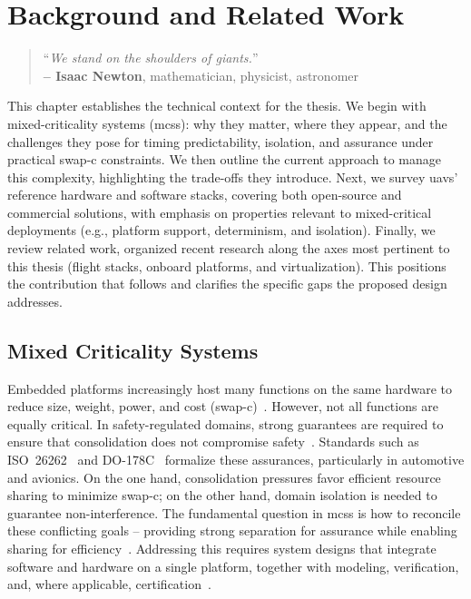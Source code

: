 %
\chapter{Background and Related Work}%
\label{ch:state-art}
%
\begin{quote}
\begin{flushright}
``\emph{We stand on the shoulders of giants.}'' \\
\textbf{-- Isaac Newton}, mathematician, physicist, astronomer
\end{flushright}
\end{quote}

This chapter establishes the technical context for the thesis. We begin with mixed-criticality systems (\glspl{mcs}): why they matter, where they appear, and the challenges they pose for timing predictability, isolation, and assurance under practical \gls{swap-c} constraints. We then outline the current approach to manage this complexity, highlighting the trade-offs they introduce.
%
Next, we survey \glspl{uav}' reference hardware and software
stacks, covering both open-source and commercial solutions, with emphasis on
properties relevant to mixed-critical deployments (e.g., platform support,
determinism, and isolation).
%
Finally, we review related work, organized recent research along the axes most
pertinent to this thesis (flight stacks, onboard platforms, and
virtualization). This positions the contribution that follows and clarifies the
specific gaps the proposed design addresses.

\section{Mixed Criticality Systems}%
\label{sec:mixed-crit-syst}
Embedded platforms increasingly host many functions on the same hardware to
reduce size, weight, power, and cost (\gls{swap-c})~\cite{burns2022mixed}.
However, not all functions are equally critical. In safety-regulated domains,
strong guarantees are required to ensure that consolidation does not compromise
safety~\cite{burns2022mixed,davis_mixed_2018}.
%
Standards such as ISO~26262~\cite{iso26262} and DO-178C~\cite{sc_167_software_1992}
formalize these assurances, particularly in automotive and avionics.
On the one hand, consolidation pressures favor efficient resource sharing to
minimize \gls{swap-c}; on the other hand, domain isolation is needed to
guarantee non-interference. The fundamental question in \glspl{mcs} is how to
reconcile these conflicting goals -- providing strong separation for assurance
while enabling sharing for efficiency~\cite{burns2022mixed}. Addressing this
requires system designs that integrate software and hardware on a single
platform, together with modeling, verification, and, where applicable,
certification~\cite{davis_mixed_2018,youn_software_2015}.


